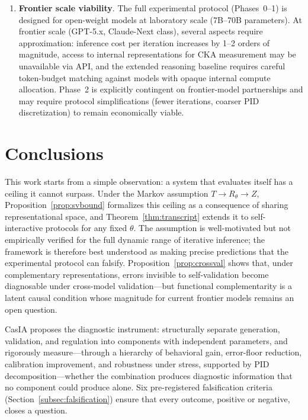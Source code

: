\documentclass[11pt,a4paper]{article}
\theoremstyle{definition}
\newcommand{\Rtheta}{R_\theta}
\begin{document}
\begin{enumerate}[leftmargin=*,itemsep=3pt]
\item \textbf{Frontier scale viability}. The full experimental protocol (Phases~0--1) is designed for open-weight models at laboratory scale (7B--70B parameters). At frontier scale (GPT-5.x, Claude-Next class), several aspects require approximation: inference cost per iteration increases by 1--2 orders of magnitude, access to internal representations for CKA measurement may be unavailable via API, and the extended reasoning baseline requires careful token-budget matching against models with opaque internal compute allocation. Phase~2 is explicitly contingent on frontier-model partnerships and may require protocol simplifications (fewer iterations, coarser PID discretization) to remain economically viable.
\end{enumerate}


\section{Conclusions}
\label{sec:conclusions}

This work starts from a simple observation: a system that evaluates itself has a ceiling it cannot surpass. Under the Markov assumption $T \to \Rtheta \to Z$, Proposition~\ref{prop:svbound} formalizes this ceiling as a consequence of sharing representational space, and Theorem~\ref{thm:transcript} extends it to self-interactive protocols for any fixed $\theta$. The assumption is well-motivated but not empirically verified for the full dynamic range of iterative inference; the framework is therefore best understood as making precise predictions that the experimental protocol can falsify. Proposition~\ref{prop:crossval} shows that, under complementary representations, errors invisible to self-validation become diagnosable under cross-model validation---but functional complementarity is a latent causal condition whose magnitude for current frontier models remains an open question.

CasIA proposes the diagnostic instrument: structurally separate generation, validation, and regulation into components with independent parameters, and rigorously measure---through a hierarchy of behavioral gain, error-floor reduction, calibration improvement, and robustness under stress, supported by PID decomposition---whether the combination produces diagnostic information that no component could produce alone. Six pre-registered falsification criteria (Section~\ref{subsec:falsification}) ensure that every outcome, positive or negative, closes a question.
\end{document}
